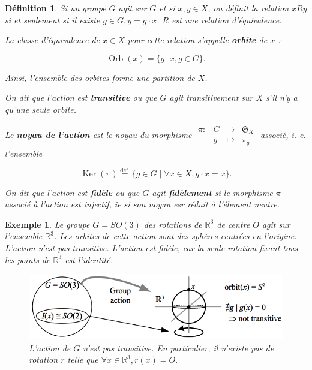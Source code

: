 \documentclass[french]{article}
\newtheorem{protodefinition}{Définition}[section]
\newenvironment{definition}
    {\colorlet{shadecolor}{green!5}\begin{shaded}\begin{protodefinition}}
    {\end{protodefinition}\end{shaded}}
\newtheorem*{exemple}{Exemple}
\begin{document}
\begin{definition}
  Si un groupe \(G\) agit sur \(G\) et si  \(x,y \in X\), on définit la relation \(x R y\) si et seulement si il existe \(g \in G, y = g \cdot x\). \(R\) est une relation d'équivalence.

  La classe d'équivalence de \(x \in X\) pour cette relation s'appelle \textbf{orbite} de \(x\) :

  \begin{equation}\label{fidele}
    \operatorname{Orb}(x) = \{ g \cdot x, g \in G \}.
  \end{equation}

  Ainsi, l'ensemble des orbites forme une partition de \(X\).

  On dit que l'action est \textbf{transitive} ou que \(G\) agit transitivement sur \(X\) s'il n'y a qu'une seule orbite.

  Le \textbf{noyau de l'action} est le noyau du morphisme
  \(\begin{matrix}
  \pi : & G & \longrightarrow & \mathfrak{S}_{X}  \\
  \ & g & \longmapsto & \pi_g
  \end{matrix}\) associé, i. e. l'ensemble

  \[\operatorname{Ker}(\pi) \stackrel{\text{déf.}}{=} \{ g \in G \mid \forall x \in X, g \cdot x = x \}. \]

  On dit que l'action est \textbf{fidèle} ou que $G$ agit \textbf{fidèlement} si le morphisme $\pi$ associé à l'action est injectif, ie si son noyau esr réduit à l'élement neutre.
\end{definition}


\begin{exemple}
  Le groupe \(G = SO(3)\) des rotations de \(\mathbb{R}^3\) de centre \(O\) agit sur l'ensemble \(\mathbb{R}^3\). Les orbites de cette action sont des sphères centrées en l'origine. L'action n'est pas transitive. L'action est fidèle, car la seule rotation fixant tous les points de \(\mathbb{R}^3\) est l'identité.

  \begin{figure}[h!]
    \centering
    \includegraphics[scale=0.5]{action-groupe-rotation.png}
    \caption{L'action de \(G\) n'est pas transitive. En particulier, il n'existe pas de rotation \(r\) telle que \(\forall x \in \mathbb{R}^3, r(x) = O.\) }
    \label{action-groupe-rotation}
  \end{figure}
\end{exemple}
\end{document}
